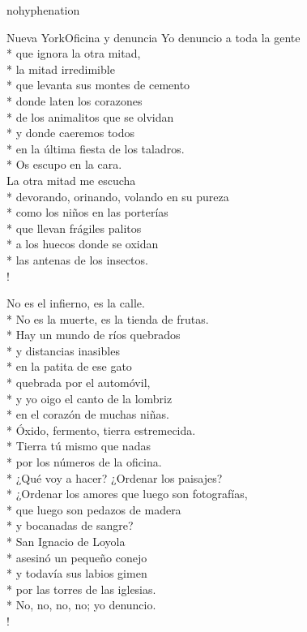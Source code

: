 \documentclass[
    a5paper,
    DIV=10,
    12pt,
    notitlepage,
    oneside,]
{scrbook} %
\begin{document}
\begin{hyphenrules}{nohyphenation}
\begin{poem}{Nueva York}{Oficina y denuncia}{}
Yo denuncio a toda la gente\\*
que ignora la otra mitad,\\*
la mitad irredimible\\*
que levanta sus montes de cemento\\*
donde laten los corazones\\*
de los animalitos que se olvidan\\*
y donde caeremos todos\\*
en la última fiesta de los taladros.\\*
Os escupo en la cara.\\

La otra mitad me escucha\\*
devorando, orinando, volando en su pureza\\*
como los niños en las porterías\\*
que llevan frágiles palitos\\*
a los huecos donde se oxidan\\*
las antenas de los insectos.\\!

No es el infierno, es la calle.\\*
No es la muerte, es la tienda de frutas.\\*
Hay un mundo de ríos quebrados\\*
y distancias inasibles\\*
en la patita de ese gato\\*
quebrada por el automóvil,\\*
y yo oigo el canto de la lombriz\\*
en el corazón de muchas niñas.\\*
Óxido, fermento, tierra estremecida.\\*
Tierra tú mismo que nadas\\*
por los números de la oficina.\\*
¿Qué voy a hacer? ¿Ordenar los paisajes?\\*
¿Ordenar los amores que luego son fotografías,\\*
que luego son pedazos de madera\\*
y bocanadas de sangre?\\*
San Ignacio de Loyola\\*
asesinó un pequeño conejo\\*
y todavía sus labios gimen\\*
por las torres de las iglesias.\\*
No, no, no, no; yo denuncio.\\!


\end{poem}
\end{hyphenrules}
\end{document}

